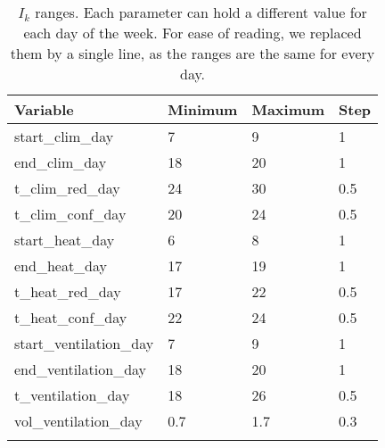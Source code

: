 \begin{table}
	\centering
	\begin{tabular}{@{}llll@{}}
		Variable                & Minimum & Maximum & Step \\ \midrule
		start\_clim\_day        & 7       & 9       & 1    \\
		end\_clim\_day          & 18      & 20      & 1    \\
		t\_clim\_red\_day       & 24      & 30      & 0.5  \\
		t\_clim\_conf\_day      & 20      & 24      & 0.5  \\
		start\_heat\_day        & 6       & 8       & 1    \\
		end\_heat\_day          & 17      & 19      & 1    \\
		t\_heat\_red\_day       & 17      & 22      & 0.5  \\
		t\_heat\_conf\_day      & 22      & 24      & 0.5  \\
		start\_ventilation\_day & 7       & 9       & 1    \\
		end\_ventilation\_day   & 18      & 20      & 1    \\
		t\_ventilation\_day     & 18      & 26      & 0.5  \\
		vol\_ventilation\_day   & 0.7     & 1.7     & 0.3  \\
		\bottomrule                                        \\
	\end{tabular}
	\caption{$I_k$ ranges. Each parameter can hold a different value for each day of the week. For ease of reading, we replaced them by a single line, as the ranges are the same for every day.}
	\label{tab:Ik}

\end{table}

